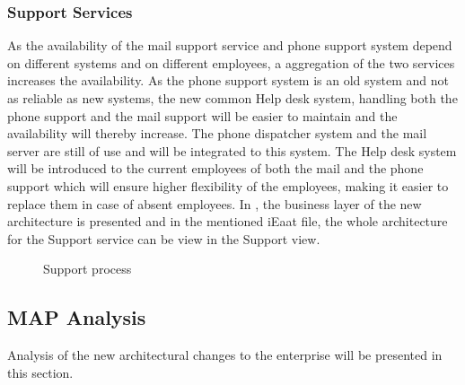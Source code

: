 \subsubsection{Support Services}
As the availability of the mail support service and phone support system depend on different systems and on different employees, a aggregation of the two services increases the availability. As the phone support system is an old system and not as reliable as new systems, the new common Help desk system, handling both the phone support and the mail support will be easier to maintain and the availability will thereby increase. The phone dispatcher system and the mail server are still of use and will be integrated to this system. The Help desk system will be introduced to the current employees of both the mail and the phone support which will ensure higher flexibility of the employees, making it easier to replace them in case of absent employees. In , the business layer of the new architecture is presented and in the mentioned iEaat file, the whole architecture for the Support service can be view in the Support view.
\begin{center}
	\begin{figure}[H]
		\centering
		\setlength\fboxsep{7pt}
		\setlength\fboxrule{0.5pt}
		\caption{Support process}
		\label{fig:map_support_tobe}
	\end{figure}
\end{center}
\subsection{MAP Analysis}
\label{sec:map_analysis_to_be}
Analysis of the new architectural changes to the enterprise will be presented in this section.
%
